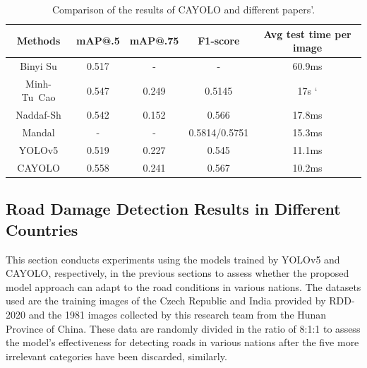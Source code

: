\documentclass[sensors,article,submit,moreauthors]{Definitions/mdpi}
\begin{document}
    \begin{table}[H]
        \caption{Comparison of the results of CAYOLO and different papers'.\label{tab:4}}
        \begin{tabularx}{\textwidth}{CCCCC}
            \toprule
            \textbf{Methods}                        & \textbf{mAP@.5} & \textbf{mAP@.75} & \textbf{F1-score} & \textbf{Avg test time per image} \\
            \midrule
            Binyi Su\citep{su2022fsrdd}             & 0.517           & -                & -                 & 60.9ms                           \\
            \mbox{Minh-Tu Cao\citep{cao2020survey}} & 0.547           & 0.249            & 0.5145            & 17s `                            \\
            Naddaf-Sh\citep{Naddaf-Sh2020efficient} & 0.542           & 0.152            & 0.566             & 17.8ms                           \\
            Mandal\citep{Mandal2020deep}            & -               & -                & 0.5814/0.5751     & 15.3ms                           \\
            YOLOv5                                  & 0.519           & 0.227            & 0.545             & 11.1ms                           \\
            CAYOLO                                  & 0.558           & 0.241            & 0.567             & 10.2ms                           \\
            \bottomrule
        \end{tabularx}
    \end{table}

    \subsection{Road Damage Detection Results in Different Countries}

    This section conducts experiments using the models trained by YOLOv5 and CAYOLO, respectively, in the previous sections to assess whether the proposed model approach can adapt to the road conditions in various nations. The datasets used are the training images of the Czech Republic and India provided by RDD-2020 and the 1981 images collected by this research team from the Hunan Province of China. These data are randomly divided in the ratio of 8:1:1 to assess the model's effectiveness for detecting roads in various nations after the five more irrelevant categories have been discarded, similarly.
\end{document}
